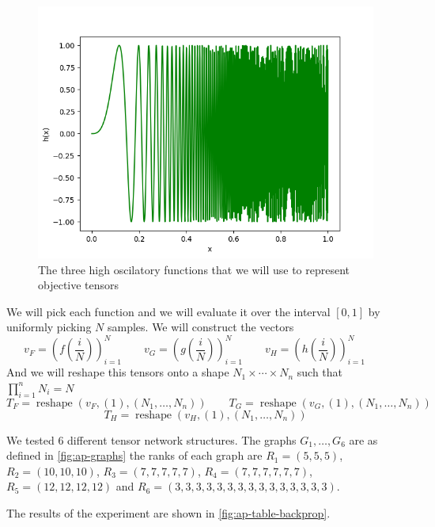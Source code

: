 \documentclass[11pt,a4paper,openright,oneside]{book}
\numberwithin{equation}{section}
\newcommand{\figref}[1]{\cref{#1}}
\DeclareMathOperator{\reshape}{reshape}
\begin{document}
{\begin{figure}[H]
\begin{adjustwidth}{-30pt}{-30pt}
\begin{minipage}[t]{0.32\linewidth}
        \includegraphics[width=\linewidth]{media/h.png}
        \caption*{$h(x)=\sin(1000x^3)$}
    \end{minipage}
\end{adjustwidth}
    \caption{The three high oscilatory functions that we will use to represent objective tensors}
\end{figure}

We will pick each function and we will evaluate it over the interval $[0,1]$ by uniformly picking $N$ samples. We will construct the
vectors 
$$v_F = \left( f\left(\frac{i}{N}\right) \right)_{i=1}^N \qquad
v_G = \left( g\left(\frac{i}{N}\right) \right)_{i=1}^N \qquad
v_H = \left( h\left(\frac{i}{N}\right) \right)_{i=1}^N \qquad$$
And we will reshape this tensors onto a shape $N_1 \times \cdots \times N_n$ such that $\prod_{i=1}^n N_i = N$
$$
T_F = \reshape(v_F, (1), (N_1, \dots, N_n)) \qquad
T_G = \reshape(v_G, (1), (N_1, \dots, N_n))$$
$$T_H = \reshape(v_H, (1), (N_1, \dots, N_n))$$

We tested $6$ different tensor network structures. The graphs $G_1, \dots, G_6$ are as defined in \ref{fig:ap-graphs}
the ranks of each graph are $R_1 = (5, 5, 5)$, $R_2 = (10, 10, 10)$, $R_3 = (7,7,7,7,7)$, $R_4 = (7,7,7,7,7,7)$,
$R_5 = (12, 12, 12 ,12)$ and $R_6 = (3,3,3,3,3,3,3,3,3,3,3,3,3,3,3)$.

The results of the experiment are shown in \figref{fig:ap-table-backprop}.

}
\end{document}
